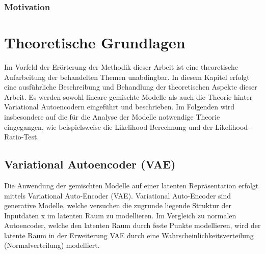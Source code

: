 \documentclass[%
thesis=student,%
coverpage=false,%
titlepage=false,%
headmarks=true, %
german,%
font=libertine, %
math=newpxtx, %
BCOR=5mm,%
coverBCOR=11mm%
]{tumbook}
\theoremstyle{break}
\begin{document}
\subsection{Motivation}


\chapter{Theoretische Grundlagen}
Im Vorfeld der Erörterung der Methodik dieser Arbeit ist eine theoretische Aufarbeitung der behandelten Themen unabdingbar. In diesem Kapitel erfolgt eine ausführliche Beschreibung und Behandlung der theoretischen Aspekte dieser Arbeit. Es werden sowohl lineare gemischte Modelle als auch die Theorie hinter Variational Autoencodern eingeführt und beschrieben. Im Folgenden wird insbesondere auf die für die Analyse der Modelle notwendige Theorie eingegangen, wie beispielsweise die Likelihood-Berechnung und der Likelihood-Ratio-Test.



\section{Variational Autoencoder (VAE)}
Die Anwendung der gemischten Modelle auf einer latenten Repräsentation erfolgt mittels Variational Auto-Encoder (VAE). Variational Auto-Encoder sind generative Modelle, welche versuchen die zugrunde liegende Struktur der Inputdaten x im latenten Raum zu modellieren. Im Vergleich zu normalen Autoencoder, welche den latenten Raum durch feste Punkte modellieren, wird der latente Raum in der Erweiterung VAE durch eine Wahrscheinlichkeitsverteilung (Normalverteilung) modelliert.\\
\end{document}
